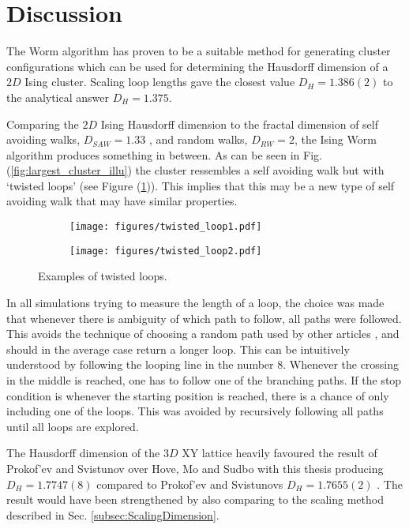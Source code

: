 \section{Discussion}
\label{sec:Discussion}

The Worm algorithm has proven to be a suitable method for generating cluster configurations which can be used for determining the Hausdorff dimension of a $2D$ Ising cluster. Scaling loop lengths gave the closest value $D_H = 1.386(2)$ to the analytical answer $D_H = 1.375$\cite{Duplantier:GeoHausdorff}.

Comparing the $2D$ Ising Hausdorff dimension to the fractal dimension of self avoiding walks, $D_{SAW} = 1.33$ \cite{Vilgis:FlorySAW}, and random walks, $D_{RW} = 2$, the Ising Worm algorithm produces something in between. As can be seen in Fig. (\ref{fig:largest_cluster_illu}) the cluster ressembles a self avoiding walk but with `twisted loops' (see Figure (\ref{fig:twisted_loops})). This implies that this may be a new type of self avoiding walk that may have similar properties.


\begin{figure}[h!]
\centering
    \begin{subfigure}{.4\textwidth}
        \centering
        \texttt{[image: figures/twisted\_loop1.pdf]}
    \end{subfigure}
    \begin{subfigure}{.4\textwidth}
        \centering
        \texttt{[image: figures/twisted\_loop2.pdf]}
    \end{subfigure}
    \caption{Examples of twisted loops.}
\label{fig:twisted_loops}
\end{figure}


In all simulations trying to measure the length of a loop, the choice was made that whenever there is ambiguity of which path to follow, all paths were followed. This avoids the technique of choosing a random path used by other articles \cite{Hove:hausdorff_crit_fluctuations}, and should in the average case return a longer loop. This can be intuitively understood by following the looping line in the number $8$. Whenever the crossing in the middle is reached, one has to follow one of the branching paths. If the stop condition is whenever the starting position is reached, there is a chance of only including one of the loops. This was avoided by recursively following all paths until all loops are explored.

The Hausdorff dimension of the $3D$ XY lattice heavily favoured the result of Prokof'ev and Svistunov over Hove, Mo and Sudbo with this thesis producing $D_H = 1.7747(8)$ compared to Prokof'ev and Svistunovs $D_H = 1.7655(2)$ \cite{Prokofev:comment_on_hove_hausdorff_crit_fluct}. The result would have been strengthened by also comparing to the scaling method described in Sec. \ref{subsec:ScalingDimension}.

